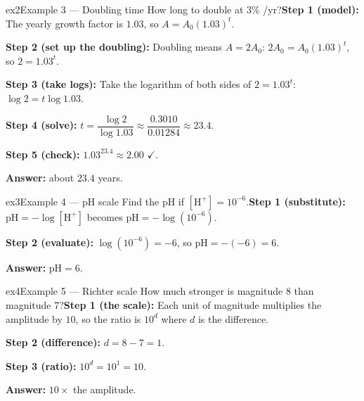 \documentclass[11pt]{article}
\begin{document}
\begin{example}{ex2}{Example 3 --- Doubling time}
How long to double at 3\% /yr?\soln \textbf{Step 1 (model):} The yearly growth factor is $1.03$, so $A=A_0(1.03)^t$.

\textbf{Step 2 (set up the doubling):} Doubling means $A=2A_0$: $2A_0=A_0(1.03)^t$, so $2=1.03^t$.

\textbf{Step 3 (take logs):} Take the logarithm of both sides of $2=1.03^t$: $\log2=t\log1.03$.

\textbf{Step 4 (solve):} $t=\dfrac{\log2}{\log1.03}\approx\dfrac{0.3010}{0.01284}\approx23.4$.

\textbf{Step 5 (check):} $1.03^{23.4}\approx2.00$ $\checkmark$.

\textbf{Answer:} about $23.4$ years.

\end{example}

\begin{example}{ex3}{Example 4 --- pH scale}
Find the pH if $[\text{H}^+]=10^{-6}$.\soln \textbf{Step 1 (substitute):} $\text{pH}=-\log[\text{H}^+]$ becomes $\text{pH}=-\log(10^{-6})$.

\textbf{Step 2 (evaluate):} $\log(10^{-6})=-6$, so $\text{pH}=-(-6)=6$.

\textbf{Answer:} $\text{pH}=6$.
\end{example}

\begin{example}{ex4}{Example 5 --- Richter scale}
How much stronger is magnitude 8 than magnitude 7?\soln \textbf{Step 1 (the scale):} Each unit of magnitude multiplies the amplitude by $10$, so the ratio is $10^d$ where $d$ is the difference.

\textbf{Step 2 (difference):} $d=8-7=1$.

\textbf{Step 3 (ratio):} $10^d=10^1=10$.

\textbf{Answer:} $10\times$ the amplitude.
\end{example}
\end{document}
